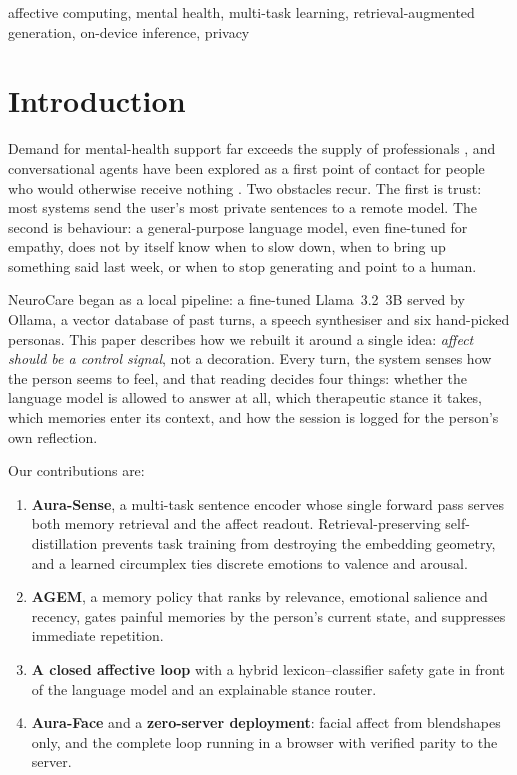 \documentclass[conference]{IEEEtran}
\begin{document}
\begin{IEEEkeywords}
affective computing, mental health, multi-task learning, retrieval-augmented generation, on-device inference, privacy
\end{IEEEkeywords}

\section{Introduction}

Demand for mental-health support far exceeds the supply of professionals \cite{who2022}, and conversational agents have been explored as a first point of contact for people who would otherwise receive nothing \cite{fitzpatrick2017,abdalrazaq2019}. Two obstacles recur. The first is trust: most systems send the user's most private sentences to a remote model. The second is behaviour: a general-purpose language model, even fine-tuned for empathy, does not by itself know when to slow down, when to bring up something said last week, or when to stop generating and point to a human.

NeuroCare began as a local pipeline: a fine-tuned Llama~3.2~3B \cite{grattafiori2024,hu2022lora} served by Ollama, a vector database of past turns, a speech synthesiser and six hand-picked personas. This paper describes how we rebuilt it around a single idea: \emph{affect should be a control signal}, not a decoration. Every turn, the system senses how the person seems to feel, and that reading decides four things: whether the language model is allowed to answer at all, which therapeutic stance it takes, which memories enter its context, and how the session is logged for the person's own reflection.

Our contributions are:
\begin{enumerate}
\item \textbf{Aura-Sense}, a multi-task sentence encoder whose single forward pass serves both memory retrieval and the affect readout. Retrieval-preserving self-distillation prevents task training from destroying the embedding geometry, and a learned circumplex ties discrete emotions to valence and arousal.
\item \textbf{AGEM}, a memory policy that ranks by relevance, emotional salience and recency, gates painful memories by the person's current state, and suppresses immediate repetition.
\item \textbf{A closed affective loop} with a hybrid lexicon--classifier safety gate in front of the language model and an explainable stance router.
\item \textbf{Aura-Face} and a \textbf{zero-server deployment}: facial affect from blendshapes only, and the complete loop running in a browser with verified parity to the server.
\end{enumerate}
\end{document}
